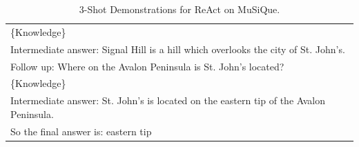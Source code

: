 \begin{table}[t!]
{\begin{tabular}{p{\textwidth}}
\{Knowledge\}\\
Intermediate answer: Signal Hill is a hill which overlooks the city of St. John's.\\
Follow up: Where on the Avalon Peninsula is St. John's located?\\
\{Knowledge\}\\
Intermediate answer: St. John's is located on the eastern tip of the Avalon Peninsula.\\
So the final answer is: eastern tip\\
\bottomrule
\end{tabular}
}
\caption{3-Shot Demonstrations for ReAct on MuSiQue.}\label{tab:MuSiQue-react}
\end{table}
\endgroup

\begingroup
\setlength{\tabcolsep}{3pt}
\renewcommand{\arraystretch}{1}
